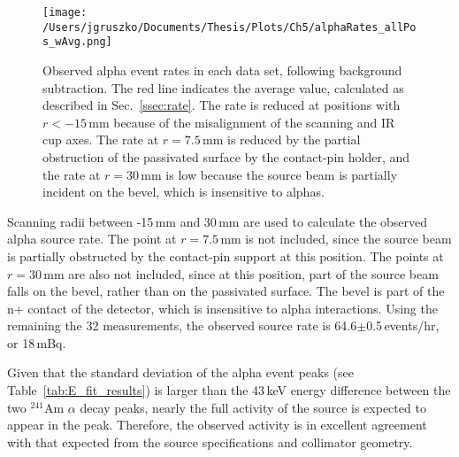 \begin{figure}[]
 \centering
 \texttt{[image: /Users/jgruszko/Documents/Thesis/Plots/Ch5/alphaRates\_allPos\_wAvg.png]}
 \caption[Observed alpha event rates in each TUBE data set, following background subtraction]{Observed alpha event rates in each data set, following background subtraction. The red line indicates the average value, calculated as described in Sec.~\ref{ssec:rate}. The rate is reduced at positions with $r<-15$\,mm because of the misalignment of the scanning and IR cup axes. The rate at $r=7.5$\,mm is reduced by the partial obstruction of the passivated surface by the contact-pin holder, and the rate at $r=30$\,mm is low because the source beam is partially incident on the bevel, which is insensitive to alphas.} 
 \label{fig:alpha_rate}
\end{figure}

Scanning radii between -15\,mm and 30\,mm are used to calculate the observed alpha source rate. The point at $r = 7.5$\,mm is not included, since the source beam is partially obstructed by the contact-pin support at this position. The points at $r = 30$\,mm are also not included, since at this position, part of the source beam falls on the bevel, rather than on the passivated surface. The bevel is part of the n+ contact of the detector, which is insensitive to alpha interactions. Using the remaining the 32 measurements, the observed source rate is 64.6$\pm$0.5\,events/hr, or 18\,mBq.

Given that the standard deviation of the alpha event peaks (see Table~\ref{tab:E_fit_results}) is larger than the 43\,keV energy difference between the two $^{241}$Am $\alpha$ decay peaks, nearly the full activity of the source is expected to appear in the peak. Therefore, the observed activity is in excellent agreement with that expected from the source specifications and collimator geometry. 
